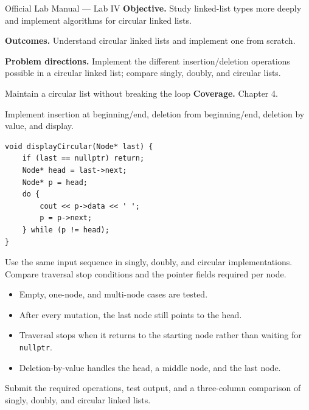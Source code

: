 
\begin{sourcealignment}{Official Lab Manual --- Lab IV}
\textbf{Objective.} Study linked-list types more deeply and implement algorithms for circular linked lists.

\textbf{Outcomes.} Understand circular linked lists and implement one from scratch.

\textbf{Problem directions.} Implement the different insertion/deletion operations possible in a circular linked list; compare singly, doubly, and circular lists.
\end{sourcealignment}

\begin{labproject}{Maintain a circular list without breaking the loop}
\textbf{Coverage.} Chapter 4.

Implement insertion at beginning/end, deletion from beginning/end, deletion by value, and display.

\begin{lstlisting}
void displayCircular(Node* last) {
    if (last == nullptr) return;
    Node* head = last->next;
    Node* p = head;
    do {
        cout << p->data << ' ';
        p = p->next;
    } while (p != head);
}
\end{lstlisting}

\begin{tryit}
Use the same input sequence in singly, doubly, and circular implementations. Compare traversal stop conditions and the pointer fields required per node.
\end{tryit}
\end{labproject}

\begin{verification}
\begin{itemize}
  \item Empty, one-node, and multi-node cases are tested.
  \item After every mutation, the last node still points to the head.
  \item Traversal stops when it returns to the starting node rather than waiting for \texttt{nullptr}.
  \item Deletion-by-value handles the head, a middle node, and the last node.
\end{itemize}
\end{verification}

\begin{labdeliverable}
Submit the required operations, test output, and a three-column comparison of singly, doubly, and circular linked lists.
\end{labdeliverable}
